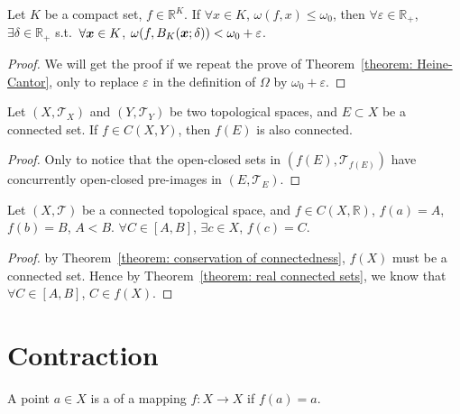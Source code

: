 \documentclass[openany]{book}
\begin{document}
\begin{theorem}
	\label{theorem: generalised Cantor}
	Let $K$ be a compact set, $f \in \mathbb R^K$.
	If $\forall x \in K$, $\omega(f, x) \leq \omega_0$, then $\forall \varepsilon \in \mathbb R_+$, $\exists \delta \in \mathbb R_+$ s.t.\ $\forall \boldsymbol{x} \in K$, $\omega(f, B_K(\boldsymbol{x}; \delta)) < \omega_0 + \varepsilon$.
\end{theorem}
\begin{proof}
	We will get the proof if we repeat the prove of Theorem~\ref{theorem: Heine-Cantor}, only to replace $\varepsilon$ in the definition of $\varOmega$ by $\omega_0 + \varepsilon$.
\end{proof}

\begin{theorem}\label{theorem: conservation of connectedness}
	Let $(X, \mathscr T_X)$ and $(Y, \mathscr T_Y)$ be two topological spaces, and $E \subset X$ be a connected set. 
	If $f \in C(X, Y)$, then $f(E)$ is also connected.
\end{theorem}
\begin{proof}
	Only to notice that the open-closed sets in $(f(E), \mathscr T_{ f(E)})$ have concurrently open-closed pre-images in $(E, \mathscr T_E)$.
\end{proof}

\begin{theorem}%
	\label{theorem: intermediate-value}
	Let $(X, \mathscr T)$ be a connected topological space, and $f \in C(X, \mathbb R)$, $f(a) = A$, $f(b) = B$, $A < B$.
	$\forall C \in [A, B]$, $\exists c \in X$, $f(c) = C$.
\end{theorem}
\begin{proof}
	by Theorem~\ref{theorem: conservation of connectedness}, $f(X)$ must be a connected set. Hence by Theorem~\ref{theorem: real connected sets}, we know that $\forall C \in [A, B]$, $C \in f(X)$.
\end{proof}

\section{Contraction}

\begin{definition}\label{definition: fixed point}
	A point $a\in X$ is a  of a mapping $f \colon X \to X$ if $f( a) = a$.
\end{definition}
\end{document}
